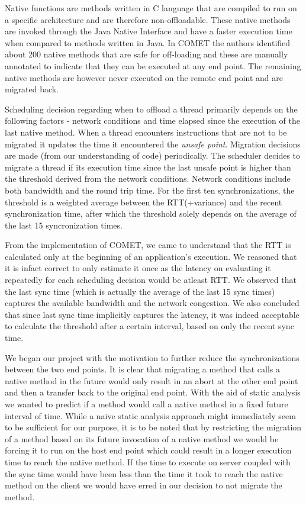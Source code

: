 Native functions are methods written in C language that are compiled to run on a
specific architecture and are therefore non-offloadable. These native methods
are invoked through the Java Native Interface and have a faster execution time when
compared to methods written in Java. In COMET the authors identified about 200
native methods that are safe for off-loading and these are manually annotated to indicate
that they can be executed at any end point. The remaining native methods are
however never executed on the remote end point and are migrated back.

Scheduling decision regarding when to offload a thread primarily depends on the following
factors - network conditions and time elapsed since the execution of the last
native method. When a thread encounters instructions that are not to be migrated it
updates the time it encountered the \textit{unsafe point}. Migration decisions are made (from our
understanding of code) periodically. The scheduler decides to migrate a thread if
its execution time since the last unsafe point is higher than the threshold
derived from the network conditions. Network conditions include both bandwidth and the
round trip time. For the first ten synchronizations, the threshold is a weighted
average between the RTT(+variance) and the recent synchronization time, after which
the threshold solely depends on the average of the last 15 syncronization times.

From the implementation of COMET, we came to understand that the RTT is calculated
only at the beginning of an application's execution. We reasoned that it is infact
correct to only estimate it once as the latency on evaluating it repeatedly for
each scheduling decision would be atleast RTT. We observed that the last sync
time (which is actually the average of the last 15 sync times) captures the
available bandwidth and the network congestion. We also concluded that since
last sync time implicitly captures the latency, it was indeed acceptable to
calculate the threshold after a certain interval, based on only the recent sync time.

We began our project with the motivation to further reduce the synchronizations
between the two end points. It is clear that migrating a method that calls a
native method in the future would only result in an abort at the other end point
and then a transfer back to the original end point. With the aid of static analysis
we wanted to predict if a method would call a native method in a fixed future interval
of time. While a naive static analysis approach might immediately seem to be
sufficient for our purpose, it is to be noted that by restricting the migration of a
method based on its future invocation of a native method we would be forcing it to
run on the host end point which could result in a longer execution time to reach the
native method. If the time to execute on server coupled with the sync time
would have been less than the time it took to reach the native method on the client
we would have erred in our decision to not migrate the method.

